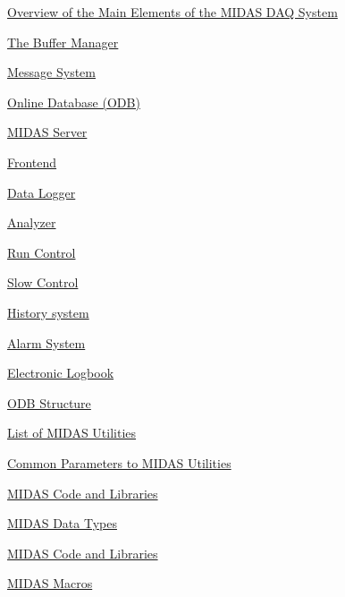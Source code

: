 \begin{TabularC}{2}
\begin{TabularC}{2}
\begin{DoxyItemize}
\item \hyperlink{F_MainElements}{Overview of the Main Elements of the MIDAS DAQ System} 
\begin{DoxyItemize}
\item \hyperlink{F_MainElements_F_Buffer_Manager_overview}{The Buffer Manager} 
\item \hyperlink{F_MainElements_F_Message_System_overview}{Message System} 
\item \hyperlink{F_MainElements_F_Online_Database_overview}{Online Database (ODB)} 
\item \hyperlink{F_MainElements_F_Midas_Server_overview}{MIDAS Server} 
\item \hyperlink{F_MainElements_F_Frontend_sec_overview}{Frontend} 
\item \hyperlink{F_MainElements_F_Data_Logger_overview}{Data Logger} 
\item \hyperlink{F_MainElements_F_Analyzer_sec_overview}{Analyzer} 
\item \hyperlink{F_MainElements_F_Run_Control_overview}{Run Control} 
\item \hyperlink{F_MainElements_F_Slow_Control_overview}{Slow Control} 
\item \hyperlink{F_MainElements_F_History_System_overview}{History system} 
\item \hyperlink{F_MainElements_F_Alarm_System_overview}{Alarm System} 
\item \hyperlink{F_MainElements_F_Electronic_Logbook_overview}{Electronic Logbook} 
\end{DoxyItemize}\par
 
\item \hyperlink{F_ODB_Structure}{ODB Structure} \par
 
\item \hyperlink{F_Utilities_List}{List of MIDAS Utilities} 
\begin{DoxyItemize}
\item \hyperlink{F_Utilities_List_F_utilities_params}{Common Parameters to MIDAS Utilities} 
\end{DoxyItemize}\par
 
\item \hyperlink{F_Midas_Code_and_Libraries}{MIDAS Code and Libraries} 
\begin{DoxyItemize}
\item \hyperlink{F_Midas_Code_and_Libraries_F_Midas_Data_Types}{MIDAS Data Types} 
\item \hyperlink{F_Midas_Code_and_Libraries_F_Midas_Library}{MIDAS Code and Libraries} 
\item \hyperlink{F_Midas_Code_and_Libraries_F_midas_macro}{MIDAS Macros} 
\end{DoxyItemize}\par
 

\end{DoxyItemize}
\end{TabularC}
\end{TabularC}
